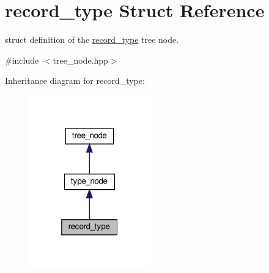 \hypertarget{structrecord__type}{}\section{record\+\_\+type Struct Reference}
\label{structrecord__type}


struct definition of the \hyperlink{structrecord__type}{record\+\_\+type} tree node.  




{\ttfamily \#include $<$tree\+\_\+node.\+hpp$>$}



Inheritance diagram for record\+\_\+type\+:
\nopagebreak
\begin{figure}[H]
\begin{center}
\leavevmode
\includegraphics[width=148pt]{d6/d81/structrecord__type__inherit__graph}
\end{center}
\end{figure}


